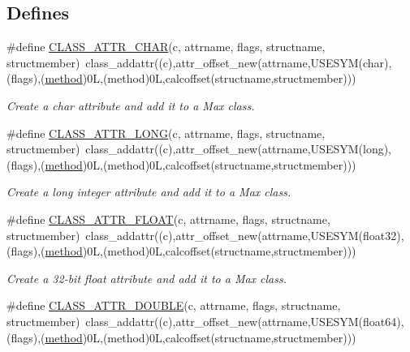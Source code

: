 \subsection*{Defines}
\begin{DoxyCompactItemize}
\item 
\#define \hyperlink{group__attr_ga155d0006cea5a22fe0832a9fa52b2814}{CLASS\_\-ATTR\_\-CHAR}(c, attrname, flags, structname, structmember)~class\_\-addattr((c),attr\_\-offset\_\-new(attrname,USESYM(char),(flags),(\hyperlink{group__datatypes_gac26ba0a173b50597f5738132e059b42d}{method})0L,(method)0L,calcoffset(structname,structmember)))
\begin{DoxyCompactList}\small\item\em Create a char attribute and add it to a Max class. \item\end{DoxyCompactList}\item 
\#define \hyperlink{group__attr_ga43c26d1f717ae67c1634b4ed4df5645c}{CLASS\_\-ATTR\_\-LONG}(c, attrname, flags, structname, structmember)~class\_\-addattr((c),attr\_\-offset\_\-new(attrname,USESYM(long),(flags),(\hyperlink{group__datatypes_gac26ba0a173b50597f5738132e059b42d}{method})0L,(method)0L,calcoffset(structname,structmember)))
\begin{DoxyCompactList}\small\item\em Create a long integer attribute and add it to a Max class. \item\end{DoxyCompactList}\item 
\#define \hyperlink{group__attr_ga037bd219fe11f1f2e73d1257ca508047}{CLASS\_\-ATTR\_\-FLOAT}(c, attrname, flags, structname, structmember)~class\_\-addattr((c),attr\_\-offset\_\-new(attrname,USESYM(float32),(flags),(\hyperlink{group__datatypes_gac26ba0a173b50597f5738132e059b42d}{method})0L,(method)0L,calcoffset(structname,structmember)))
\begin{DoxyCompactList}\small\item\em Create a 32-\/bit float attribute and add it to a Max class. \item\end{DoxyCompactList}\item 
\#define \hyperlink{group__attr_ga99c033bd774138a770c3b638ef475d1f}{CLASS\_\-ATTR\_\-DOUBLE}(c, attrname, flags, structname, structmember)~class\_\-addattr((c),attr\_\-offset\_\-new(attrname,USESYM(float64),(flags),(\hyperlink{group__datatypes_gac26ba0a173b50597f5738132e059b42d}{method})0L,(method)0L,calcoffset(structname,structmember)))

\end{DoxyCompactItemize}
